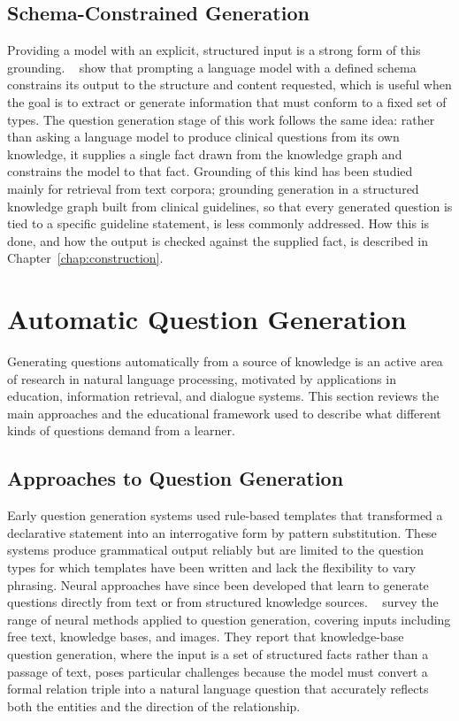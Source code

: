 \subsection{Schema-Constrained Generation}
\label{sec:bg-grounding-schema}

Providing a model with an explicit, structured input is a strong form of this
grounding. ~\cite{caufield2024} show that prompting a language
model with a defined schema constrains its output to the structure and content
requested, which is useful when the goal is to extract or generate information
that must conform to a fixed set of types. The question generation stage of
this work follows the same idea: rather than asking a language model to produce
clinical questions from its own knowledge, it supplies a single fact drawn from
the knowledge graph and constrains the model to that fact. Grounding of this
kind has been studied mainly for retrieval from text corpora; grounding
generation in a structured knowledge graph built from clinical guidelines, so
that every generated question is tied to a specific guideline statement, is
less commonly addressed. How this is done, and how the output is checked
against the supplied fact, is described in Chapter~\ref{chap:construction}.

\section{Automatic Question Generation}
\label{sec:bg-qg}

Generating questions automatically from a source of knowledge is an active
area of research in natural language processing, motivated by applications
in education, information retrieval, and dialogue systems. This section
reviews the main approaches and the educational framework used to describe
what different kinds of questions demand from a learner.

\subsection{Approaches to Question Generation}
\label{sec:bg-qg-approaches}

Early question generation systems used rule-based templates that transformed
a declarative statement into an interrogative form by pattern substitution.
These systems produce grammatical output reliably but are limited to the
question types for which templates have been written and lack the flexibility
to vary phrasing. Neural approaches have since been developed that learn to
generate questions directly from text or from structured knowledge sources.
~\cite{guo2024} survey the range of neural methods applied to
question generation, covering inputs including free text, knowledge bases, and
images. They report that knowledge-base question generation, where the input
is a set of structured facts rather than a passage of text, poses particular
challenges because the model must convert a formal relation triple into a
natural language question that accurately reflects both the entities and the
direction of the relationship.

